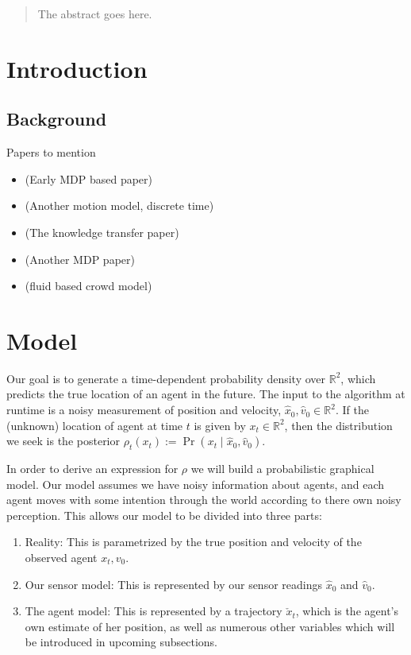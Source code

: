 \documentclass[conference]{IEEEtran}
\begin{document}
\begin{abstract}
The abstract goes here.
\end{abstract}

\IEEEpeerreviewmaketitle

\section{Introduction}


\subsection{Background}
Papers to mention
\begin{itemize}
	\item \citet{Kitani2012} (Early MDP based paper)
	\item \citet{Karasev2016} (Another motion model, discrete time)
	\item \citet{Ballan2016} (The knowledge transfer paper)
	\item \citet{Ziebart2009} (Another MDP paper)
	\item \citet{Helbing1992} (fluid based crowd model)
\end{itemize}

\section{Model}


Our goal is to generate a time-dependent probability density over $\mathbb{R}^2$, which predicts the true location of an agent in the future.
The input to the algorithm at runtime is a noisy measurement of position and velocity, $\hat{x}_0, \hat{v}_0 \in \mathbb{R}^2$.
If the (unknown) location of agent at time $t$ is given by $x_t \in \mathbb{R}^2$, then the distribution we seek is the posterior $\rho_t(x_t) := \Pr( x_t \mid \hat{x}_0, \hat{v}_0 )$.

In order to derive an expression for $\rho$ we will build a probabilistic graphical model.
Our model assumes we have noisy information about agents, and each agent moves with some intention through the world according to there own noisy perception.
This allows our model to be divided into three parts:
\begin{enumerate}
	\item Reality:  This is parametrized by the true position and velocity of the observed agent $x_t, v_0$.
	\item Our sensor model:  This is represented by our sensor readings $\hat{x}_0$ and $\hat{v}_0$.
	\item The agent model:  This is represented by a trajectory $\check{x}_t$, which is the agent's own estimate of her position, as well as numerous other variables which will be introduced in upcoming subsections.
\end{enumerate}
\end{document}
